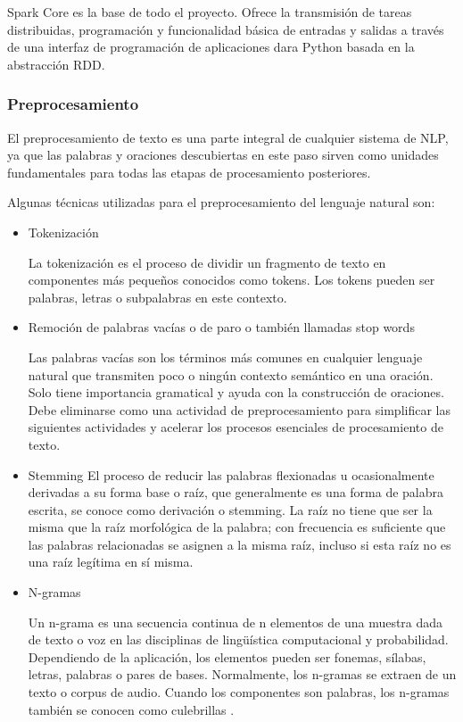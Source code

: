 \documentclass[12pt]{article}
\begin{document}
			Spark Core es la base de todo el proyecto. Ofrece la transmisión de tareas distribuidas, programación y funcionalidad básica de entradas y salidas a través de una interfaz de programación de aplicaciones dara Python basada en la abstracción RDD.\cite{Vermeulen2018}
			
			\subsubsection{Preprocesamiento}
			El preprocesamiento de texto es una parte integral de cualquier sistema de NLP, ya que las palabras y oraciones descubiertas en este paso sirven como unidades fundamentales para todas las etapas de procesamiento posteriores. \cite{Kannan2014}%
			
			Algunas técnicas utilizadas para el preprocesamiento del lenguaje natural  son:
			
			\begin{itemize}
			\item Tokenización
			
			La tokenización es el proceso de dividir un fragmento de texto en componentes más pequeños conocidos como tokens. Los tokens pueden ser palabras, letras o subpalabras en este contexto. \cite{Senanayake2019}
			
			\item Remoción de palabras vacías o de paro o también llamadas stop words
			
			Las palabras vacías son los términos más comunes en cualquier lenguaje natural que transmiten poco o ningún contexto semántico en una oración. Solo tiene importancia gramatical y ayuda con la construcción de oraciones. Debe eliminarse como una actividad de preprocesamiento para simplificar las siguientes actividades y acelerar los procesos esenciales de procesamiento de texto.\cite{Raulji2016}
			
			\item Stemming
			El proceso de reducir las palabras flexionadas u ocasionalmente derivadas a su forma base o raíz, que generalmente es una forma de palabra escrita, se conoce como derivación o stemming. La raíz no tiene que ser la misma que la raíz morfológica de la palabra; con frecuencia es suficiente que las palabras relacionadas se asignen a la misma raíz, incluso si esta raíz no es una raíz legítima en sí misma.\cite{Gupta2013}
			
			\item N-gramas
			
			Un n-grama es una secuencia continua de n elementos de una muestra dada de texto o voz en las disciplinas de lingüística computacional y probabilidad. Dependiendo de la aplicación, los elementos pueden ser fonemas, sílabas, letras, palabras o pares de bases. Normalmente, los n-gramas se extraen de un texto o corpus de audio. Cuando los componentes son palabras, los n-gramas también se conocen como culebrillas \cite{Broder1997}.			
			
			\end{itemize}
						
\end{document}

